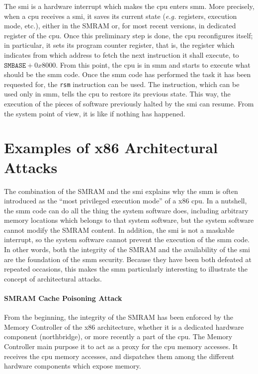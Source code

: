 The \ac{smi} is a hardware interrupt which makes the \ac{cpu} enters \ac{smm}.
%
More precisely, when a \ac{cpu} receives a \ac{smi}, it saves its current state
(\emph{e.g.} registers, execution mode, etc.), either in the SMRAM or, for most
recent versions, in dedicated register of the \ac{cpu}.
%
Once this preliminary step is done, the \ac{cpu} reconfigures itself;
%
in particular, it sets its program counter register, that is, the register which
indicates from which address to fetch the next instruction it shall execute, to
$\texttt{SMBASE} + 0x8000$.
%
From this point, the \ac{cpu} is in \ac{smm} and starts to execute what should
be the \ac{smm} code.
%
Once the \ac{smm} code has performed the task it has been requested for, the
\texttt{rsm} instruction can be used.
%
The instruction, which can be used only in \ac{smm}, tells the \ac{cpu} to
restore its previous state.
%
This way, the execution of the pieces of software previously halted by the
\ac{smi} can resume.
%
From the system point of view, it is like if nothing has happened.

\section{Examples of x86 Architectural Attacks}
\label{sec:usecase:hse}

The combination of the SMRAM and the \ac{smi} explains why the \ac{smm} is often
introduced as the ``most privileged execution mode'' of a x86 \ac{cpu}.
%
In a nutshell, the \ac{smm} code can do all the thing the system software does,
including arbitrary memory locations which belongs to that system software, but
the system software cannot modify the SMRAM content.
%
In addition, the \ac{smi} is not a maskable interrupt, so the system software
cannot prevent the execution of the \ac{smm} code.
%
In other words, both the integrity of the SMRAM and the availability of the
\ac{smi} are the foundation of the \ac{smm} security.
%
Because they have been both defeated at repeated occasions, this makes the \ac{smm}
particularly interesting to illustrate the concept of architectural attacks.

\paragraph{SMRAM Cache Poisoning Attack}
%
From the beginning, the integrity of the SMRAM has been enforced by the Memory
Controller of the x86 architecture, whether it is a dedicated hardware component
(northbridge), or more recently a part of the \ac{cpu}.
%
The Memory Controller main purpose it to act as a proxy for the \ac{cpu} memory
accesses.
%
It receives the \ac{cpu} memory accesses, and dispatches them among the
different hardware components which expose memory.

